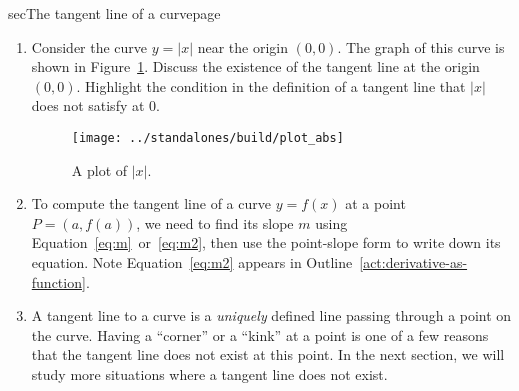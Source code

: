 \documentclass[../main]{subfiles}
\begin{document}
\begin{outline}{sec}{The tangent line of a curve}{page}
\begin{enumerate}
  \item Consider the curve \(y = |x|\) near the origin \((0,0)\). The graph of this curve is shown in Figure~\ref{fig:abs}. Discuss the existence of the tangent line at the origin \((0,0)\).  Highlight the condition in the definition of a tangent line that \(|x|\) does not satisfy at \(0\). 
      \begin{figure}
        \centering
        \texttt{[image: ../standalones/build/plot\_abs]}
        \caption{A plot of \(|x|\).}
        \label{fig:abs}
      \end{figure}
    \item {To compute the tangent line of a curve \(y = f(x)\) at a point \(P = (a, f(a))\), we need to find its slope \(m\) using Equation~\eqref{eq:m}~or~\eqref{eq:m2}, then use the point-slope form to write down its equation. Note Equation~\eqref{eq:m2} appears in Outline~\ref{act:derivative-as-function}.}
    \item {A tangent line to a curve is a \emph{uniquely} defined line passing through a point on the curve. Having a ``corner'' or a ``kink'' at a point is one of a few reasons that the tangent line does not exist at this point. In the next section, we will study more situations where a tangent line does not exist.}
  \end{enumerate}
\end{outline}
\end{document}
